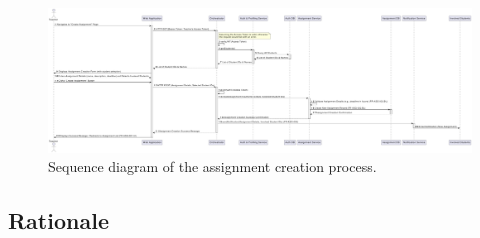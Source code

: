 \begin{figure}[h]
    \centering
    \includegraphics[width=0.9\linewidth]{Architettura/imgs/assign_create_seq.pdf}
    \caption{Sequence diagram of the assignment creation process.}
    \label{fig:seqAssignmentCreation}
\end{figure}

\subsection{Rationale}

